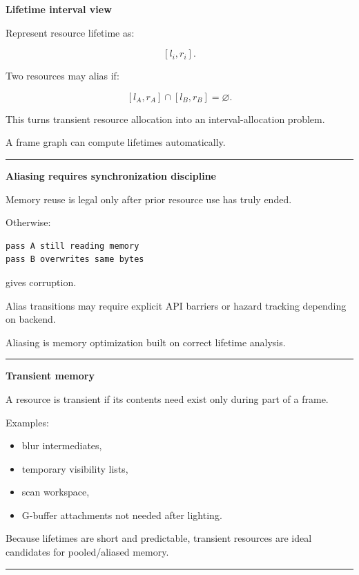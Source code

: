 \textbf{Lifetime interval view}

Represent resource lifetime as:

\[
[l_i,r_i].
\]

Two resources may alias if:

\[
[l_A,r_A]
\cap
[l_B,r_B]
=
\varnothing.
\]

This turns transient resource allocation into an interval-allocation problem.

A frame graph can compute lifetimes automatically.

\begin{center}\rule{0.5\linewidth}{0.5pt}\end{center}

\textbf{Aliasing requires synchronization discipline}

Memory reuse is legal only after prior resource use has truly ended.

Otherwise:

\protect{}\label{p10-alias-bug}%
\begin{verbatim}
pass A still reading memory
pass B overwrites same bytes
\end{verbatim}

gives corruption.

Alias transitions may require explicit API barriers or hazard tracking depending on backend.

Aliasing is memory optimization built on correct lifetime analysis.

\begin{center}\rule{0.5\linewidth}{0.5pt}\end{center}

\textbf{Transient memory}

A resource is transient if its contents need exist only during part of a frame.

Examples:

\begin{itemize}
\tightlist
\item
  blur intermediates,
\item
  temporary visibility lists,
\item
  scan workspace,
\item
  G-buffer attachments not needed after lighting.
\end{itemize}

Because lifetimes are short and predictable, transient resources are ideal candidates for pooled/aliased memory.

\begin{center}\rule{0.5\linewidth}{0.5pt}\end{center}


